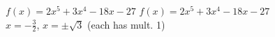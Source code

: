 {$f(x) = 2x^5+3x^4-18x-27$}
{$f(x) = 2x^5+3x^4-18x-27$ \\ $x = -\frac{3}{2}$, $x = \pm \sqrt{3}$ (each has mult. 1)}